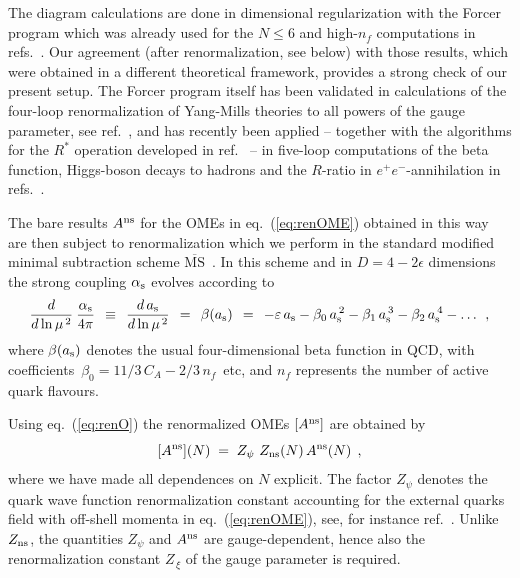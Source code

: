 \documentclass[12pt]{article}
\newcommand{\beq}{\begin{equation}}
\newcommand{\eeq}{\end{equation}}
\newcommand{\MSb}{$\overline{\mbox{MS}}$}
\newcommand{\als}{\alpha_{\rm s}}
\newcommand{\ars}{a_{\rm s}}
\newcommand{\ep}{\varepsilon}
\def\ar(#1){{a_{\rm s}^{\,#1}}}
\def\mus{{\mu^{\,2}}}
\def\ca{{C^{}_A}}
\def\nf{{n^{}_{\! f}}}
\begin{document}
\bigskip

The diagram calculations are done in dimensional regularization
\cite{tHooft:1972tcz,Bollini:1972ui} with the {\sc Forcer} program 
\cite{Ruijl:2017cxj} which was already used for the $N \leq 6$ and 
high-$\nf$ computations in refs.~\cite{Ruijl:2016pkm,Davies:2016jie}. 
Our agreement (after renormalization, see below) with those results, which 
were obtained in a different theoretical framework, provides a strong check 
of our present setup.
%
The {\sc Forcer} program itself has been validated in calculations of the 
four-loop renormalization of Yang-Mills theories to all powers of the gauge 
parameter, see ref.~\cite{Ruijl:2017eht}, and has recently been applied 
-- together with the algorithms for the $R^\ast$ operation 
\cite{Chetyrkin:1982nn,Chetyrkin:1984xa} developed in 
ref.~\cite{Herzog:2017bjx} -- in five-loop computations of the beta function,
Higgs-boson decays to hadrons and the $R$-ratio in $e^+e^-$-annihilation in 
refs.~\cite{Herzog:2017ohr,Herzog:2017dtz}.

\bigskip

The bare results $A^{\rm ns}$ for the OMEs in eq.~(\ref{eq:renOME}) obtained
in this way are then subject to renormalization which we perform in the
standard modified minimal subtraction scheme 
\MSb~\cite{tHooft:1973mfk,Bardeen:1978yd}.
In this scheme and in $D=4-2\epsilon$ dimensions the strong coupling $\als$ 
evolves according to
%
\beq
\label{eq:arun}
  \frac{d}{d \ln \mus}\: \frac{\als}{4\pi} \:\: \equiv \:\: 
  \frac{d\,\ars}{d \ln \mus} \:\: = \:\: \beta(\ars) \:\: = \:\:
  - \ep\, \ars - \beta_0\, \ar(2) - \beta_1\, \ar(3) 
  - \beta_2\, \ar(4) - \ldots \:\: ,
\eeq
%
where $\beta(\ars)$ denotes the usual four-dimensional beta function in QCD,
with coefficients $\,\beta_0 = 11/3\,\ca - 2/3\,\nf\,$ etc, and $\nf$ 
represents the number of active quark flavours.

Using eq.~(\ref{eq:renO}) the renormalized OMEs $[A^{\rm ns}]$ are obtained by 
%
\beq
\label{eq:ZqZns-OME}
  [A^{\rm ns}](N) \;=\; Z_{\psi}\,\, Z_{\rm ns}(N)\, A^{\rm ns}(N)
\:\: ,
\eeq
%
where we have made all dependences on $N$ explicit. 
The factor $Z_{\psi}$ denotes the quark wave function renormalization constant 
accounting for the external quarks field with off-shell momenta in 
eq.~(\ref{eq:renOME}), see, for instance ref.~\cite{Ruijl:2017eht}.
Unlike $Z_{\rm ns}$, the quantities $Z_{\psi}$ and $A^{\rm ns}$ are 
gauge-dependent, hence also the renormalization constant $Z_{\,\xi}$ of the 
gauge parameter is required.
\end{document}
